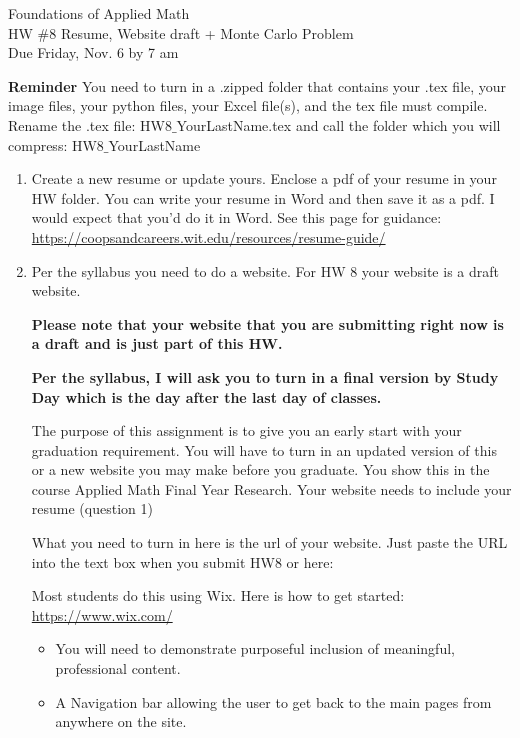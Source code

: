 \documentclass[12pt,letterpaper]{article}
\begin{document}
Foundations of Applied Math\\
 HW \#8 Resume, Website draft + Monte Carlo Problem\\
 Due Friday, Nov. 6 by 7 am
 
\textbf{Reminder} You need to turn in a .zipped folder that contains your .tex file, your image files, your python files, your Excel file(s), and the tex file must compile.
Rename the .tex file: HW8$\_$YourLastName.tex and call the folder which you will compress: HW8$\_$YourLastName


\begin{enumerate}

\item Create a new resume or update yours. Enclose a pdf of your resume in your HW folder. You can write your resume in Word and then save it as a pdf. I would expect that you'd do it in Word.
See this page for guidance: \url{https://coopsandcareers.wit.edu/resources/resume-guide/}  
\\


\item Per the syllabus you need to do a website. For HW 8 your website is a draft website.

\textbf{Please note that your website that you are submitting right now is a draft and is just part of this HW.}

\textbf{Per the syllabus, I will ask you to turn in a final version by Study Day which is the day after the last day of classes.}

 The purpose of this assignment is to give you an early start with your graduation requirement.  You will have to turn in an updated version of this or a new website you may make before you graduate.  You show this in the course Applied Math Final Year Research.  
Your website needs to include your resume (question 1) 

What you need to turn in here is the url of your website.  Just paste the URL into the text box when you submit HW8 or here:





Most students do this using Wix. Here is how to get started: \url{https://www.wix.com/}
\begin{itemize}

\item You will need to demonstrate purposeful inclusion of meaningful, professional content.

\item A Navigation bar allowing the user to get back to the main pages from anywhere on the site.


\end{itemize}
\end{enumerate}
\end{document}

